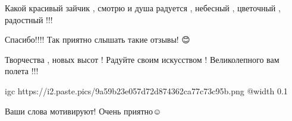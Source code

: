  
 
 
 
 

\qqSecCmt


Какой красивый зайчик , смотрю и душа радуется , небесный , цветочный , радостный !!!

\begin{itemize} %

Спасибо!!!! Так приятно слышать такие отзывы! 😊🐇🐰
\end{itemize} %


Творчества , новых высот ! Радуйте своим искусством ! Великолепного вам полета !!!

\begin{itemize} %

\ifcmt
  igc https://i2.paste.pics/9a59b23e057d72d874362ca77c73c95b.png
	@width 0.1
\fi


Ваши слова мотивируют! Очень приятно☺

\end{itemize} %
